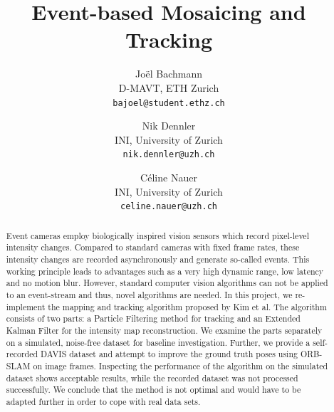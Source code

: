 \documentclass[10pt,twocolumn,letterpaper]{article}
\begin{document}
\title{Event-based Mosaicing and Tracking}

\author{Jo\"el Bachmann\\
D-MAVT, ETH Zurich\\
{\tt\small bajoel@student.ethz.ch}
\and
Nik Dennler\\
INI, University of Zurich\\
{\tt\small nik.dennler@uzh.ch}
\and
C\'eline Nauer\\
INI, University of Zurich\\
{\tt\small celine.nauer@uzh.ch}
}



\maketitle

\begin{abstract}
Event cameras employ biologically inspired vision sensors which record pixel-level intensity changes. Compared to standard cameras with fixed frame rates, these intensity changes are recorded asynchronously and generate so-called events. 
This working principle leads to advantages such as a very high dynamic range, low latency and no motion blur. 
However, standard computer vision algorithms can not be applied to an event-stream and thus, novel algorithms are needed. In this project, we re-implement the mapping and tracking algorithm proposed by Kim et al. 
The algorithm consists of two parts: a Particle Filtering method for tracking and an Extended Kalman Filter for the intensity map reconstruction. We examine the parts separately on a simulated, noise-free dataset for baseline investigation.
Further, we provide a self-recorded DAVIS dataset and attempt to improve the ground truth poses using ORB-SLAM on image frames. Inspecting the performance of the algorithm on the simulated dataset shows acceptable results, while the recorded dataset was not processed successfully. We conclude that the method is not optimal and would have to be adapted further in order to cope with real data sets.
\end{abstract}
\end{document}
